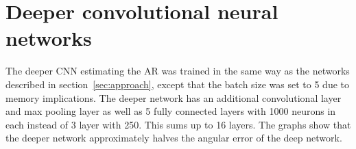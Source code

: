 




\section{Deeper convolutional neural networks}
\label{sec:deeper-cnns}
The deeper CNN estimating the AR was trained in the same way as the networks described in section~\ref{sec:approach}, except that the batch size was set to 5 due to memory implications. The deeper network has an additional convolutional layer and max pooling layer as well as 5 fully connected layers with 1000 neurons in each instead of 3 layer with 250. This sums up to 16 layers. The graphs show that the deeper network approximately halves the angular error of the deep network.



